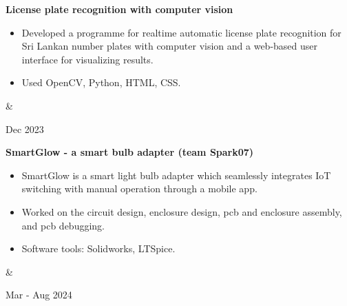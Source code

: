 \documentclass[10pt, a4paper]{article}
\newenvironment{highlights}{
        \begin{itemize}[
                topsep=0pt,
                parsep=0.10 cm,
                partopsep=0pt,
                itemsep=0pt,
                after=\vspace{-1\baselineskip},
                leftmargin=0.4 cm + 3pt
            ]
    }{
        \end{itemize}
    } %
\let\originalTabularx\tabularx
\let\originalEndTabularx\endtabularx
\renewenvironment{tabularx}{\bgroup\centering\originalTabularx}{\originalEndTabularx\par\egroup}
\begin{document}
        \vspace{0.2 cm}
        \begin{tabularx}{
            \textwidth-0.4 cm-0.13cm
        }{
            K{0.2 cm}
            R{4.1 cm}
        }
            \textbf{License plate recognition with computer vision}

            \vspace{0.10 cm}

            \begin{highlights}
                \item Developed a programme for realtime automatic license plate recognition for Sri Lankan number plates with computer vision and a web-based user interface for visualizing results.
                \item Used OpenCV, Python, HTML, CSS.
            \end{highlights}
            &
            

            Dec 2023
        \end{tabularx}
        
        
		\vspace{0.2 cm}
        \begin{tabularx}{
            \textwidth-0.4 cm-0.13cm
        }{
            K{0.2 cm}
            R{4.1 cm}
        }
            \textbf{SmartGlow - a smart bulb adapter (team Spark07)}

            \vspace{0.10 cm}

            \begin{highlights}
                \item SmartGlow is a smart light bulb adapter which seamlessly integrates IoT switching with manual operation through a mobile app. 
                \item Worked on the circuit design, enclosure design, pcb and enclosure assembly, and pcb debugging.
                \item Software tools: Solidworks, LTSpice.
            \end{highlights}
            &
            

            Mar - Aug 2024
        \end{tabularx}
        
\end{document}
